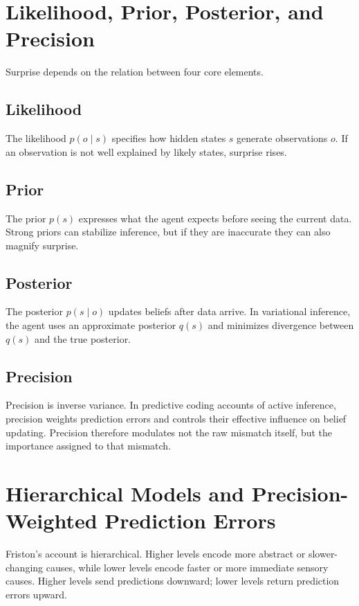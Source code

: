 \documentclass[a4paper,11pt]{article}
\begin{document}
    
    \section{Likelihood, Prior, Posterior, and Precision}
        Surprise depends on the relation between four core elements.
        
        \subsection{Likelihood}
            The likelihood $p(o \mid s)$ specifies how hidden states $s$ generate observations $o$. If an observation is not well explained by likely states, surprise rises.
        
        \subsection{Prior}
            The prior $p(s)$ expresses what the agent expects before seeing the current data. Strong priors can stabilize inference, but if they are inaccurate they can also magnify surprise.
        
        \subsection{Posterior}
            The posterior $p(s \mid o)$ updates beliefs after data arrive. In variational inference, the agent uses an approximate posterior $q(s)$ and minimizes divergence between $q(s)$ and the true posterior.
        
        \subsection{Precision}
            Precision is inverse variance. In predictive coding accounts of active inference, precision weights prediction errors and controls their effective influence on belief updating. Precision therefore modulates not the raw mismatch itself, but the importance assigned to that mismatch.
    
    
    \section{Hierarchical Models and Precision-Weighted Prediction Errors}
        Friston's account is hierarchical. Higher levels encode more abstract or slower-changing causes, while lower levels encode faster or more immediate sensory causes. Higher levels send predictions downward; lower levels return prediction errors upward.
        
\end{document}
